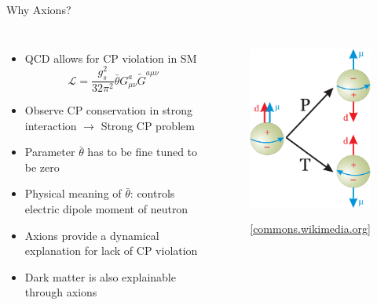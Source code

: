 \documentclass[aspectratio=1610, 9pt]{beamer}
\begin{document}
\begin{frame}{Why Axions?}
  \begin{columns}
    \begin{itemize}
      \item QCD allows for CP violation in SM\\
      \begin{equation*}
      	\mathcal{L} = \frac{g_s^2}{32 \pi^2} \bar{\theta} G^a_{\mu \nu} \tilde{G}^{a \mu \nu}
      \end{equation*}
      \item Observe CP conservation in strong interaction $\rightarrow$ Strong CP problem
      \item Parameter $\bar{\theta}$ has to be fine tuned to be zero
      \item Physical meaning of $\bar{\theta}$: controls electric dipole moment of neutron
      \item Axions provide a dynamical explanation for lack of CP violation
      \item Dark matter is also explainable through axions
    \end{itemize}
      \begin{figure}
      \includegraphics[height=6cm]{images/nEDM.png}
      \caption{\footnotesize \href{https://commons.wikimedia.org/wiki/File:NEDM_P26T_violation.png}{{[commons.wikimedia.org]}}}
      \end{figure}
  \end{columns} 
\end{frame}
\end{document}
